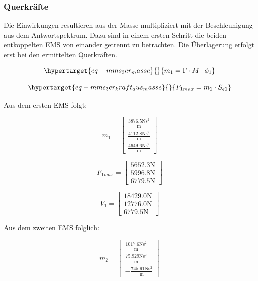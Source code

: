 \documentclass[
  letterpaper,
  DIV=11]{scrreprt}
\begin{document}
\hypertarget{querkruxe4fte}{%
\subsubsection{Querkräfte}\label{querkruxe4fte}}

Die Einwirkungen resultieren aus der Masse multipliziert mit der
Beschleunigung aus dem Antwortspektrum. Dazu sind in einem ersten
Schritt die beiden entkoppelten EMS von einander getrennt zu betrachten.
Die Überlagerung erfolgt erst bei den ermittelten Querkräften.

\begin{equation}\protect\hypertarget{eq-mms_3er_masse}{}{
m_1 = \Gamma \cdot M \cdot \phi_1
}\label{eq-mms_3er_masse}\end{equation}

\begin{equation}\protect\hypertarget{eq-mms_3er_kraft_aus_masse}{}{
F_{1max} = m_1 \cdot S_{e1}
}\label{eq-mms_3er_kraft_aus_masse}\end{equation}

Aus dem ersten EMS folgt:

\begin{equation}m_{1} = \left[\begin{matrix}\frac{3876.5 \text{N} \text{s}^{2}}{\text{m}}\\\frac{4112.8 \text{N} \text{s}^{2}}{\text{m}}\\\frac{4649.6 \text{N} \text{s}^{2}}{\text{m}}\end{matrix}\right]\end{equation}

\begin{equation}F_{1 max} = \left[\begin{matrix}5652.3 \text{N}\\5996.8 \text{N}\\6779.5 \text{N}\end{matrix}\right]\end{equation}

\begin{equation}V_{1} = \left[\begin{matrix}18429.0 \text{N}\\12776.0 \text{N}\\6779.5 \text{N}\end{matrix}\right]\end{equation}

Aus dem zweiten EMS folglich:

\begin{equation}m_{2} = \left[\begin{matrix}\frac{1017.6 \text{N} \text{s}^{2}}{\text{m}}\\\frac{75.929 \text{N} \text{s}^{2}}{\text{m}}\\- \frac{745.91 \text{N} \text{s}^{2}}{\text{m}}\end{matrix}\right]\end{equation}
\end{document}
